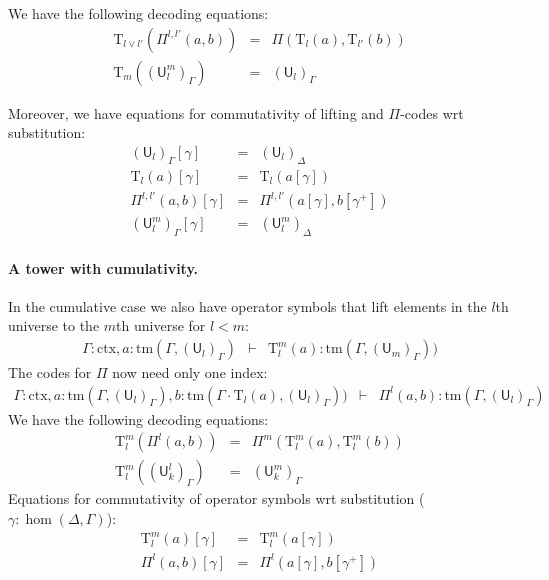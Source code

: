 \documentclass[11pt,a4paper]{article}
\theoremstyle{definition}
\newcommand{\UU}{\mathsf{U}}
\def\UU{\mathsf{U}}
\newcommand{\N}{\mathsf{N}}
\def\Pihat{\Pi}
\newcommand{\ctx}{\mathrm{ctx}}
\newcommand{\tm}{\mathrm{tm}}
\def\U{\mathsf{U}}
\newcommand{\Ta}{\mathrm{T}}
\begin{document}
We have the following decoding equations:
\begin{eqnarray*}
\Ta_{l \vee l'}(\Pi^{l,l'}(a,b)) &=& \Pi(\Ta_l(a),\Ta_{l'}(b))\\
\Ta_{m}((\UU^m_l)_\Gamma) &=& (\UU_l)_\Gamma
\end{eqnarray*}

Moreover, we have equations for commutativity of lifting and $\Pi$-codes wrt substitution:
 \begin{eqnarray*}
(\U_l)_\Gamma [ \gamma ] &=& (\U_l)_\Delta\\
\Ta_l(a) [ \gamma ] &=& \Ta_l(a[ \gamma ] )\\
\Pi^{l,l'}(a,b)[ \gamma ] &=& \Pi^{l,l'}(a [ \gamma ], b[ \gamma^+ ])\\
(\UU^m_l)_\Gamma[ \gamma ] &=&(\UU^m_l)_\Delta
\end{eqnarray*}
\paragraph{A tower with cumulativity.}
In the cumulative case we also have operator symbols that lift elements in the $l$th universe to the $m$th universe for $l < m$:
\begin{eqnarray*}
\Gamma : \ctx, a : \tm(\Gamma,(\U_{l})_\Gamma) &\vdash& {\Ta^m_{l}}(a) : \tm(\Gamma,(\U_{m})_\Gamma))
\end{eqnarray*}
The codes for $\Pi$ now need only one index:
\begin{eqnarray*}
\Gamma : \ctx,
a : \tm(\Gamma,(\U_{l})_\Gamma),
b :  \tm(\Gamma \cdot \Ta_{l}(a), (\U_{l})_\Gamma))
&\vdash&
 \Pihat^{l}(a,b) : \tm(\Gamma,(\U_{l})_\Gamma)
\end{eqnarray*}
We have the following decoding equations:
\begin{eqnarray*}
\Ta^m_{l}(\Pi^{l}(a,b)) &=& \Pi^m(\Ta^m_l(a),\Ta^m_l(b))\\
\Ta^m_l((\UU^l_k)_\Gamma) &=& (\UU^m_k)_\Gamma
\end{eqnarray*}
Equations for commutativity of operator symbols wrt substitution ($\gamma : \hom(\Delta,\Gamma)$):
\begin{eqnarray*}
\Ta^m_l(a) [ \gamma ] &=& \Ta^m_l(a[ \gamma ] )\\
\Pi^{l}(a,b)[ \gamma ] &=& \Pi^{l}(a [ \gamma ], b[ \gamma^+ ])
\end{eqnarray*}
\end{document}
